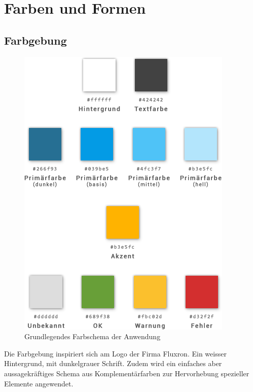 
\section{Farben und Formen}
\label{sec:Farben und Formen}

\subsection{Farbgebung}
\label{subsec:Farbgebung}
\begin{figure}[H]
    \begin{center}
        \includegraphics[trim=0 130 0 0,clip,scale=0.5]{uiux/res/basic_colors}
    \end{center}
    \caption{Grundlegendes Farbschema der Anwendung}
\end{figure}
Die Farbgebung inspiriert sich am Logo der Firma Fluxron. Ein weisser Hintergrund, mit dunkelgrauer Schrift. Zudem wird ein einfaches aber aussagekräftiges Schema aus Komplementärfarben zur Hervorhebung spezieller Elemente angewendet.

